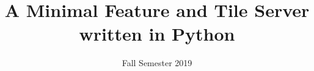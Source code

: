 \title  {A Minimal Feature and Tile Server written in Python}
\addresses  {\groupname\\\deptname\\\univname}
\date       {Fall Semester 2019}
\subject    {}
\keywords   {}

\maketitle